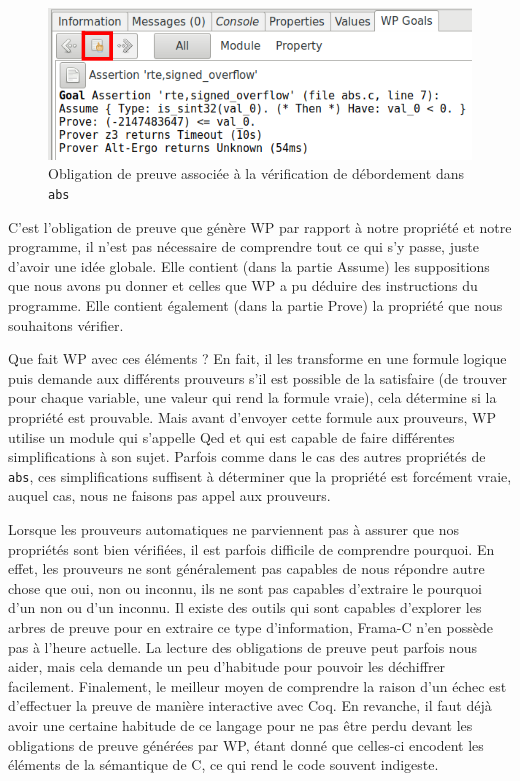 \documentclass[12pt,francais,]{scrbook}
\begin{document}
\begin{figure}[htbp]
\centering
\includegraphics[scale=0.5]{2-1-1-abs-6.png}
\caption{Obligation de preuve associée à la vérification de débordement
dans \texttt{abs}}
\label{fig:2-1-1-abs-6}
\end{figure}

C'est l'obligation de preuve que génère WP par rapport à notre propriété
et notre programme, il n'est pas nécessaire de comprendre tout ce qui
s'y passe, juste d'avoir une idée globale. Elle contient (dans la partie
\og{}Assume\fg{}) les suppositions que nous avons pu donner et celles que WP a
pu déduire des instructions du programme. Elle contient également (dans
la partie \og{}Prove\fg{}) la propriété que nous souhaitons vérifier.

Que fait WP avec ces éléments ? En fait, il les transforme en une
formule logique puis demande aux différents prouveurs s'il est possible
de la satisfaire (de trouver pour chaque variable, une valeur qui rend
la formule vraie), cela détermine si la propriété est prouvable. Mais
avant d'envoyer cette formule aux prouveurs, WP utilise un module qui
s'appelle Qed et qui est capable de faire différentes simplifications à
son sujet. Parfois comme dans le cas des autres propriétés de
\texttt{abs}, ces simplifications suffisent à déterminer que la
propriété est forcément vraie, auquel cas, nous ne faisons pas appel aux
prouveurs.

Lorsque les prouveurs automatiques ne parviennent pas à assurer que nos
propriétés sont bien vérifiées, il est parfois difficile de comprendre
pourquoi. En effet, les prouveurs ne sont généralement pas capables de
nous répondre autre chose que \og{}oui\fg{}, \og{}non\fg{} ou \og{}inconnu\fg{}, ils ne
sont pas capables d'extraire le \og{}pourquoi\fg{} d'un \og{}non\fg{} ou d'un
\og{}inconnu\fg{}. Il existe des outils qui sont capables d'explorer les
arbres de preuve pour en extraire ce type d'information, Frama-C n'en
possède pas à l'heure actuelle. La lecture des obligations de preuve
peut parfois nous aider, mais cela demande un peu d'habitude pour
pouvoir les déchiffrer facilement. Finalement, le meilleur moyen de
comprendre la raison d'un échec est d'effectuer la preuve de manière
interactive avec Coq. En revanche, il faut déjà avoir une certaine
habitude de ce langage pour ne pas être perdu devant les obligations de
preuve générées par WP, étant donné que celles-ci encodent les éléments
de la sémantique de C, ce qui rend le code souvent indigeste.
\end{document}

